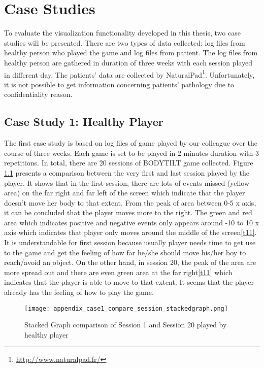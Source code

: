 \chapter{Case Studies}
To evaluate the visualization functionality developed in this thesis, two case studies will be presented. There are two types of data collected: log files from healthy person who played the game and log files from patient. The log files from healthy person are gathered in duration of three weeks with each session played in different day. The patients' data are collected by NaturalPad\footnote{\url{http://www.naturalpad.fr/}}. Unfortunately, it is not possible to get information concerning patients' pathology due to confidentiality reason. 

\section{Case Study 1: Healthy Player}
The first case study is based on log files of game played by our colleague over the course of three weeks. Each game is set to be played in 2 minutes duration with 3 repetitions. In total, there are 20 sessions of BODYTILT game collected. Figure \ref{fig:app1_stacked} presents a comparison between the very first and last session played by the player. It shows that in the first session, there are lots of events missed (yellow area) on the far right and far left of the screen which indicate that the player doesn't move her body to that extent. From the peak of area between 0-5 x axis, it can be concluded that the player moves more to the right. The green and red area which indicates positive and negative events only appears around -10 to 10 x axis which indicates that player only moves around the middle of the screen\ref{t11}. It is understandable for first session because usually player needs time to get use to the game and get the feeling of how far he/she should move his/her boy to reach/avoid an object. On the other hand, in session 20, the peak of the area are more spread out and there are even green area at the far right\ref{t11} which indicates that the player is able to move to that extent. It seems that the player already has the feeling of how to play the game.

\begin{figure}[H]
\centering
\texttt{[image: appendix\_case1\_compare\_session\_stackedgraph.png]}
\caption{Stacked Graph comparison of Session 1 and Session 20 played by healthy player}
\label{fig:app1_stacked}
\end{figure}


